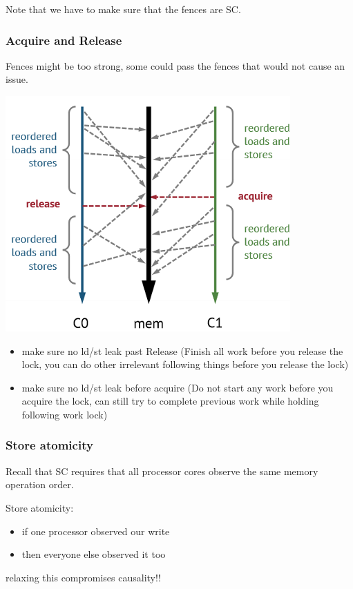 \documentclass[letterpaper,12pt]{article}
\begin{document}
Note that we have to make sure that the fences are SC.
\subsubsection{Acquire and Release}
Fences might be too strong, some could pass the fences that would not cause an issue.

\includegraphics*[scale=0.7]{./Image/Acquire and Release.png}

\begin{itemize}
    \item make sure no ld/st leak past Release (Finish all work before you release the lock, you can do other irrelevant following things before you release the lock)
    \item make sure no ld/st leak before acquire (Do not start any work before you acquire the lock, can still try to complete previous work while holding following work lock)
\end{itemize}

\subsubsection{Store atomicity}
Recall that SC requires that all processor cores observe the same memory operation order.

Store atomicity:\begin{itemize}
    \item if one processor observed our write
    \item then everyone else observed it too
\end{itemize}
relaxing this compromises causality!!
\end{document}

